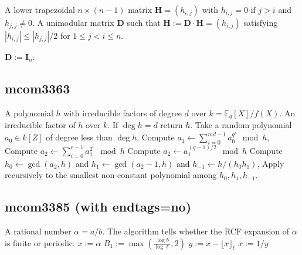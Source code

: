 \documentclass{amsart}
\begin{document}
	\begin{algorithmic}[1]
		\REQUIRE A lower trapezoidal $n\times (n-1)$ matrix $\mathbf{H}=(h_{i,j})$ with $h_{i,j}=0$ if $j>i$ and $h_{j,j}\ne 0$.
		\ENSURE A unimodular matrix $\mathbf D$ such that $\mathbf H:=\mathbf D\cdot \mathbf H = (h_{i,j})$ satisfying  $|h_{i,j}|\le |h_{j,j}|/2$ for $1\le j<i\le n$.

		\STATE $\mathbf{D} := \mathbf{I}_n$.
		\ENDFOR
		\ENDFOR
		\ENDFOR
	\end{algorithmic}

\subsection{mcom3363}

	\begin{algorithmic}[1]
		\REQUIRE A polynomial $h$  with irreducible factors of degree $d$ over $k=\mathbb{F}_q[X]/f(X)$.
		\ENSURE An irreducible factor of $h$ over $k$.
		\STATE If $\deg h = d$ return $h$.
		\STATE Take a random polynomial $a_0\in k[Z]$ of degree less than $\deg h$,
		\STATE\label{alg:ks-pseudotrace} Compute $a_1
		\leftarrow \sum_{i=0}^{md-1} a_0^{q^i} \mod h$,
		\STATE\label{alg:ks:even} Compute $a_2 \leftarrow
		\sum_{i=0}^{e-1} a_1^{2^i}\mod h$
		\ELSE
		\STATE\label{alg:ks:odd} Compute $a_2 \leftarrow a_1^{(q-1)/2}\mod h$
		\ENDIF
		\STATE\label{alg:ks:gcd} Compute $h_0\leftarrow\gcd(a_2,h)$ and
		$h_1\leftarrow\gcd(a_2-1,h)$ and $h_{-1}\leftarrow h/(h_0h_1)$,
		\STATE Apply recursively to the smallest non-constant polynomial among
		$h_0,h_1,h_{-1}$.
	\end{algorithmic}

\subsection{mcom3385 (with endtags=no)}

\makeatletter
\ALC@noendtrue
\makeatother

  \begin{algorithmic}[1]
    \REQUIRE A rational number $\alpha=a/b$.
    \ENSURE The algorithm tells whether the RCF expansion of $\alpha$ is finite or periodic.
    \STATE $x:=\alpha$
    \STATE $B_1:=\max\left(\frac{\log b}{\log\ell},2\right)$
        \ENDIF
        \STATE $y:=x-\lfloor x\rfloor_\ell$
        \ENDIF
        \STATE $x:=1/y$
    \ENDFOR
   \end{algorithmic}
\end{document}
